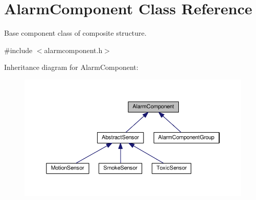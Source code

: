\hypertarget{classAlarmComponent}{}\section{Alarm\+Component Class Reference}
\label{classAlarmComponent}


Base component class of composite structure.  




{\ttfamily \#include $<$alarmcomponent.\+h$>$}



Inheritance diagram for Alarm\+Component\+:\nopagebreak
\begin{figure}[H]
\begin{center}
\leavevmode
\includegraphics[width=350pt]{classAlarmComponent__inherit__graph}
\end{center}
\end{figure}
